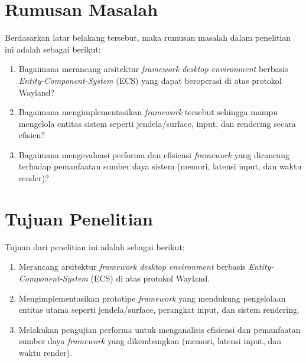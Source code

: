 \section{Rumusan Masalah} \label{I.Rumusan Masalah}
Berdasarkan latar belakang tersebut, maka rumusan masalah dalam penelitian ini adalah sebagai berikut: \par
\begin{enumerate}[noitemsep]
    \item Bagaimana merancang arsitektur \textit{framework} \textit{desktop environment} berbasis \textit{Entity-Component-System} (ECS) yang dapat beroperasi di atas protokol Wayland? 
    \item Bagaimana mengimplementasikan \textit{framework} tersebut sehingga mampu mengelola entitas sistem seperti jendela/surface, input, dan rendering secara efisien? 
    \item Bagaimana mengevaluasi performa dan efisiensi \textit{framework} yang dirancang terhadap pemanfaatan sumber daya sistem (memori, latensi input, dan waktu render)? 
\end{enumerate}
\par

\section{Tujuan Penelitian} \label{I.Tujuan}
Tujuan dari penelitian ini adalah sebagai berikut: \par
\begin{enumerate}[noitemsep]
    \item Merancang arsitektur \textit{framework} \textit{desktop environment} berbasis \textit{Entity-Component-System} (ECS) di atas protokol Wayland. 
    \item Mengimplementasikan prototipe \textit{framework} yang mendukung pengelolaan entitas utama seperti jendela/surface, perangkat input, dan sistem rendering. 
    \item Melakukan pengujian performa untuk menganalisis efisiensi dan pemanfaatan sumber daya \textit{framework} yang dikembangkan (memori, latensi input, dan waktu render). 
\end{enumerate}
\par

